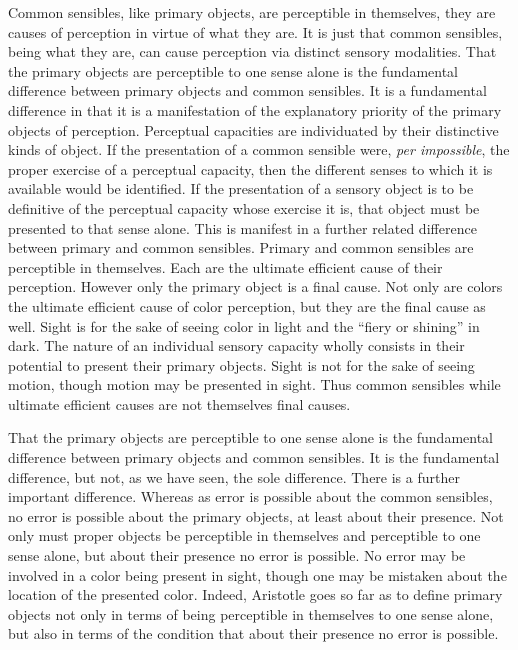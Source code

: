 Common sensibles, like primary objects, are perceptible in themselves, they are causes of perception in virtue of what they are. It is just that common sensibles, being what they are, can cause perception via distinct sensory modalities. That the primary objects are perceptible to one sense alone is the fundamental difference between primary objects and common sensibles. It is a fundamental difference in that it is a manifestation of the explanatory priority of the primary objects of perception. Perceptual capacities are individuated by their distinctive kinds of object. If the presentation of a common sensible were, \emph{per impossible}, the proper exercise of a perceptual capacity, then the different senses to which it is available would be identified. If the presentation of a sensory object is to be definitive of the perceptual capacity whose exercise it is, that object must be presented to that sense alone. This is manifest in a further related difference between primary and common sensibles. Primary and common sensibles are perceptible in themselves. Each are the ultimate efficient cause of their perception. However only the primary object is a final cause. Not only are colors the ultimate efficient cause of color perception, but they are the final cause as well. Sight is for the sake of seeing color in light and the ``fiery or shining'' in dark. The nature of an individual sensory capacity wholly consists in their potential to present their primary objects. Sight is not for the sake of seeing motion, though motion may be presented in sight. Thus common sensibles while ultimate efficient causes are not themselves final causes.

That the primary objects are perceptible to one sense alone is the fundamental difference between primary objects and common sensibles. It is the fundamental difference, but not, as we have seen, the sole difference. There is a further important difference. Whereas as error is possible about the common sensibles, no error is possible about the primary objects, at least about their presence. Not only must proper objects be perceptible in themselves and perceptible to one sense alone, but about their presence no error is possible. No error may be involved in a color being present in sight, though one may be mistaken about the location of the presented color. Indeed, Aristotle goes so far as to define primary objects not only in terms of being perceptible in themselves to one sense alone, but also in terms of the condition that about their presence no error is possible.

